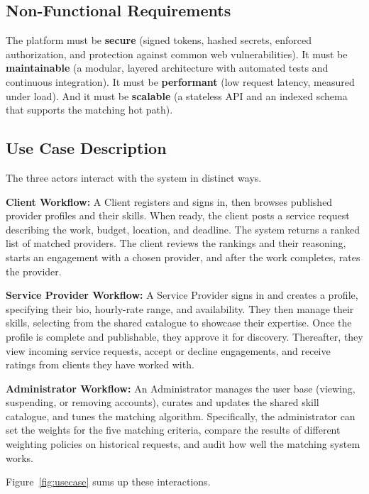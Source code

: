 \subsection{Non-Functional Requirements}
The platform must be \textbf{secure} (signed tokens, hashed secrets, enforced
authorization, and protection against common web vulnerabilities). It must be
\textbf{maintainable} (a modular, layered architecture with automated tests and
continuous integration). It must be \textbf{performant} (low request latency,
measured under load). And it must be \textbf{scalable} (a stateless API and an
indexed schema that supports the matching hot path).

\subsection{Use Case Description}
The three actors interact with the system in distinct ways.

\textbf{Client Workflow:} A Client registers and signs in, then browses
published provider profiles and their skills. When ready, the client posts a
service request describing the work, budget, location, and deadline. The system
returns a ranked list of matched providers. The client reviews the rankings and
their reasoning, starts an engagement with a chosen provider, and after the work
completes, rates the provider.

\textbf{Service Provider Workflow:} A Service Provider signs in and creates a
profile, specifying their bio, hourly-rate range, and availability. They then
manage their skills, selecting from the shared catalogue to showcase their
expertise. Once the profile is complete and publishable, they approve it for
discovery. Thereafter, they view incoming service requests, accept or decline
engagements, and receive ratings from clients they have worked with.

\textbf{Administrator Workflow:} An Administrator manages the user base (viewing,
suspending, or removing accounts), curates and updates the shared skill
catalogue, and tunes the matching algorithm. Specifically, the administrator can
set the weights for the five matching criteria, compare the results of different
weighting policies on historical requests, and audit how well the matching system
works.

Figure~\ref{fig:usecase} sums up these interactions.

